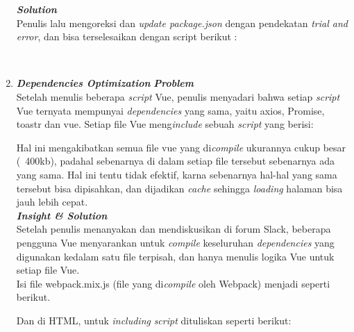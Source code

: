 \begin{enumerate}
  \textbf{\textit{Solution}} \\
    \indentenum Penulis lalu mengoreksi dan \textit{update package.json} dengan pendekatan \textit{trial and error}, dan bisa terselesaikan dengan script berikut :
		  	

			  	
	\ \\		  
\item 
	\textbf{\textit{Dependencies Optimization}} \textbf{\textit{Problem}} \\
	\indentenum Setelah menulis beberapa \textit{script} Vue, penulis menyadari bahwa setiap \textit{script} Vue ternyata mempunyai \textit{dependencies} yang sama, yaitu axios, Promise, toastr dan vue. Setiap file Vue meng\textit{include} sebuah \textit{script} yang berisi:
	

	Hal ini mengakibatkan semua file vue yang di\textit{compile} ukurannya cukup besar (~400kb), padahal sebenarnya di dalam setiap file tersebut sebenarnya ada yang sama. Hal ini tentu tidak efektif, karna sebenarnya hal-hal yang sama tersebut bisa dipisahkan, dan dijadikan \textit{cache} sehingga \textit{loading} halaman bisa jauh lebih cepat.\\
		
	\textbf{\textit{Insight \& Solution}} \\
	\indentenum Setelah penulis menanyakan dan mendiskusikan di forum Slack, beberapa pengguna Vue menyarankan untuk \textit{compile} keseluruhan \textit{dependencies} yang digunakan kedalam satu file terpisah, dan hanya menulis logika Vue untuk setiap file Vue.\\
	\indentenum Isi file webpack.mix.js (file yang di\textit{compile} oleh Webpack)	menjadi seperti berikut.
	
		
	\indentenum Dan di HTML, untuk \textit{including} \textit{script} dituliskan seperti berikut:
	

\end{enumerate}